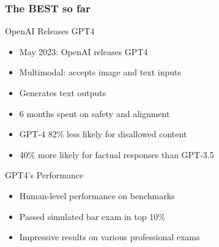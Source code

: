 
\begin{frame}[fragile]\frametitle{The BEST so far}
OpenAI Releases GPT4
    \begin{itemize}
        \item May 2023: OpenAI releases GPT4
        \item Multimodal: accepts image and text inputs
        \item Generates text outputs
        \item 6 months spent on safety and alignment
        \item GPT-4 82\% less likely for disallowed content
        \item 40\% more likely for factual responses than GPT-3.5
    \end{itemize}

GPT4's Performance
    \begin{itemize}
        \item Human-level performance on benchmarks
        \item Passed simulated bar exam in top 10\%
        \item Impressive results on various professional exams
    \end{itemize}
\end{frame}

